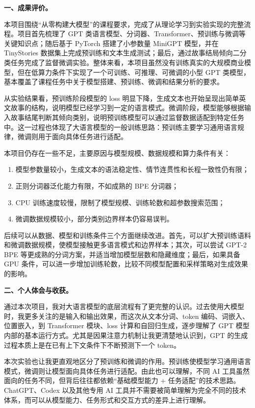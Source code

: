 \documentclass[UTF8,a4paper,zihao=-4,fontset=none]{ctexart}
\numberwithin{equation}{section}
\begin{document}
\textbf{一、成果评价。}

本项目围绕“从零构建大模型”的课程要求，完成了从理论学习到实验实现的完整流程。项目首先梳理了 GPT 类语言模型、分词器、Transformer、预训练与微调等关键知识点；随后基于 PyTorch 搭建了小参数量 MiniGPT 模型，并在 TinyStories 数据集上完成预训练和文本生成测试；最后，通过故事结局倾向二分类任务完成了监督微调实验。整体来看，本项目虽然没有训练真实的大规模商业模型，但在低算力条件下实现了一个可训练、可推理、可微调的小型 GPT 类模型，基本覆盖了课程任务中关于模型搭建、预训练、微调和结果分析的要求。

从实验结果看，预训练阶段模型的 loss 明显下降，生成文本也开始呈现出简单英文故事的结构，说明模型已经学习到一定的语言模式。微调阶段，模型能够根据输入故事结尾判断其倾向类别，说明预训练模型可以通过监督数据适配到特定任务中。这一过程也体现了大语言模型的一般训练思路：预训练主要学习通用语言规律，微调则用于面向具体任务进行适配。

本项目仍存在一些不足，主要原因与模型规模、数据规模和算力条件有关：
\begin{enumerate}
\item 模型参数量较小，生成文本的语法稳定性、情节连贯性和长程一致性仍有限；
  \item 正则分词器泛化能力有限，不如成熟的 BPE 分词器；
\item CPU 训练速度较慢，限制了模型规模、训练轮数和超参数搜索范围；
\item 微调数据规模较小，部分类别边界样本仍容易误判。
\end{enumerate}

后续可以从数据、模型和训练条件三个方面继续改进。首先，可以扩大预训练语料和微调数据规模，使模型接触更多语言模式和边界样本；其次，可以尝试 GPT-2 BPE 等更成熟的分词方案，并适当增加模型层数和隐藏维度；最后，如果具备 GPU 条件，可以进一步增加训练轮数，比较不同模型配置和采样策略对生成效果的影响。

\textbf{二、个人体会与收获。}

通过本次项目，我对大语言模型的底层流程有了更完整的认识。过去使用大模型时，我更多关注的是输入和输出效果，而这次从文本分词、token 编码、词嵌入、位置嵌入，到 Transformer 模块、loss 计算和自回归生成，逐步理解了 GPT 模型内部的基本运行方式。尤其是因果注意力机制让我更清楚地认识到，GPT 的生成过程本质上是在已有上下文条件下不断预测下一个 token。

本次实验也让我更直观地区分了预训练和微调的作用。预训练使模型学习通用语言模式，微调则让模型面向具体任务进行适配。由此也可以理解，不同 AI 工具虽然面向的任务不同，但背后往往都依赖“基础模型能力 + 任务适配”的技术思路。ChatGPT、Codex 以及其他专用 AI 工具并不需要被简单理解为完全不同的技术体系，而可以从模型能力、任务形式和交互方式的差异上进行理解。
\end{document}

